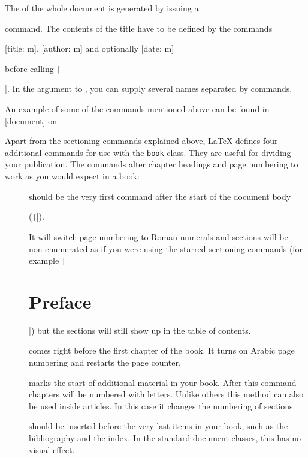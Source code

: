 The  of the whole document is generated by issuing a
\begin{lscommand}
\end{lscommand}
command. The contents of the title have to be defined by the commands
\begin{lscommand}
  [title: m], [author: m]
  and optionally [date: m]
\end{lscommand}
before calling \texttt|\maketitle|. In the argument to ,
you can supply several names separated by  commands.

An example of some of the commands mentioned above can be found in
\autoref{document} on .

Apart from the sectioning commands explained above, \LaTeX{} defines four
additional commands for use with the \texttt{book} class. They are useful for
dividing your publication. The commands alter chapter headings and page
numbering to work as you would expect in a book:
\begin{description}
  \item[] should be the very first command after the start of
    the document body
    \begin{chktexignore}
  (\texttt||).
\end{chktexignore}
    It will switch page
    numbering to Roman numerals and sections will be non-enumerated as if you were
    using the starred sectioning commands (for example
    \texttt|\chapter*{Preface}|) but the sections will still show up in
    the table of contents.
  \item[] comes right before the first chapter of
    the book. It turns on Arabic page numbering and restarts the page
    counter.
  \item[] marks the start of additional material in your book.
    After this command chapters will be numbered with letters. Unlike others
    this method can also be used inside articles. In this case it changes the
    numbering of sections.
  \item[] should be inserted before the very last items
    in your book, such as the bibliography and the index. In the standard
    document classes, this has no visual effect.
\end{description}

